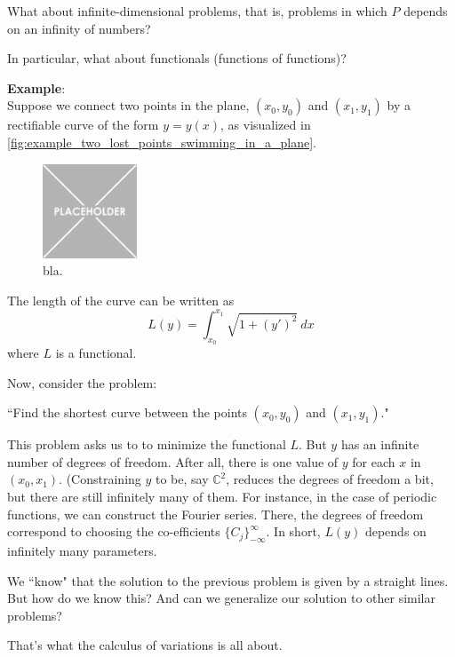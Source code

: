 What about infinite-dimensional problems, that is, problems in which $P$ depends on an infinity of numbers?

In particular, what about functionals (functions of functions)?

\bigbreak
\noindent \textbf{Example}:\\
Suppose we connect two points in the plane, $(x_0, y_0)$ and $(x_1, y_1)$ by a rectifiable curve of the form $y = y(x)$, as visualized in \autoref{fig:example_two_lost_points_swimming_in_a_plane}. 

\begin{figure}
    \centering
    \includegraphics[width=0.25\textwidth]{figures/placeholder.png}
    \caption{bla.}
    \label{fig:example_two_lost_points_swimming_in_a_plane}
\end{figure}

The length of the curve can be written as
\begin{equation*}
L(y) = \int_{x_0}^{x_1} {\sqrt{1 + (y')^2}} \ dx
\end{equation*}
where $L$ is a functional. 

Now, consider the problem: 

``Find the shortest curve between the points $(x_0, y_0)$ and $(x_1, y_1)$."

This problem asks us to to minimize the functional $L$. 
But $y$ has an infinite number of degrees of freedom. After all, there is one value of $y$ for each $x$ in $(x_0, x_1)$. 
(Constraining $y$ to be, say $\mathbb{C}^2$, reduces the degrees of freedom a bit, but there are still infinitely many of them. 
For instance, in the case of periodic functions, we can construct the Fourier series. 
There, the degrees of freedom correspond to choosing the co-efficients $\{C_j\}^\infty_{-\infty}$. 
In short, $L(y)$ depends on infinitely many parameters. 

We ``know" that the solution to the previous problem is given by a straight lines. 
But how do we know this?
And can we generalize our solution to other similar problems? 

That's what the calculus of variations is all about. 

